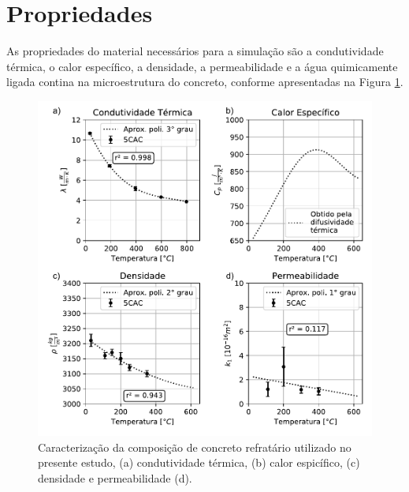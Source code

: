 \section{Propriedades}\label{sec:props}
As propriedades do material necessários para a simulação são a condutividade
térmica, o calor específico, a densidade, a permeabilidade e a água quimicamente
ligada contina na microestrutura do concreto, conforme apresentadas na Figura
\ref{fig:properties}.

 \begin{figure}[ht]
\centering
\includegraphics[width=14cm]{./figures/properties.pdf}
\caption{Caracterização da composição de concreto refratário utilizado no
  presente estudo, (a) condutividade térmica, (b) calor espicífico, (c)
  densidade e permeabilidade (d).  \label{fig:properties}}
\end{figure}

